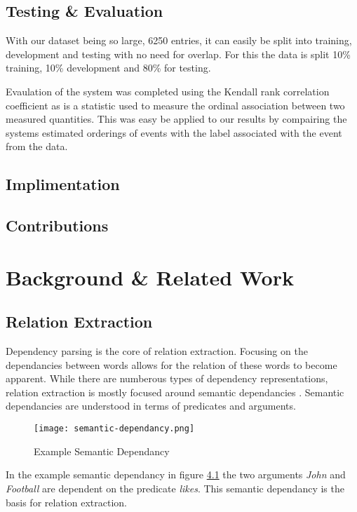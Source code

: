 \documentclass[bsc,frontabs,twoside,singlespacing,parskip,deptreport]{infthesis}     %
\begin{document}
\section{Testing \& Evaluation}
With our dataset being so large, 6250 entries, it can
easily be split into training, development and testing with no
need for overlap. For this the data is split 10\% training,
10\% development and 80\% for testing.

Evaulation of the system was completed using the
Kendall rank correlation coefficient as is a statistic
used to measure the ordinal association between two
measured quantities. This was easy be applied to our results
by compairing the systems estimated orderings of events
with the label associated with the event from the data.

\section{Implimentation}
\section{Contributions}

\chapter{Background \& Related Work}


\section{Relation Extraction}
Dependency parsing is the core of relation extraction. Focusing on the dependancies between words allows for the relation of these words to become apparent.
While there are numberous types of dependency representations, relation extraction is mostly focused around semantic dependancies \cite{mcclosky2011event}.
Semantic dependancies are understood in terms of predicates and arguments.

\begin{figure}[H]
  \centering
  \texttt{[image: semantic-dependancy.png]}
  \caption{Example Semantic Dependancy}
  \label{fig:semantic-dependancy}
\end{figure}

In the example semantic dependancy in figure \ref{fig:semantic-dependancy} the two arguments \textit{John} and \textit{Football} are dependent
on the predicate \textit{likes}. This semantic dependancy is the basis for relation extraction.
\end{document}
